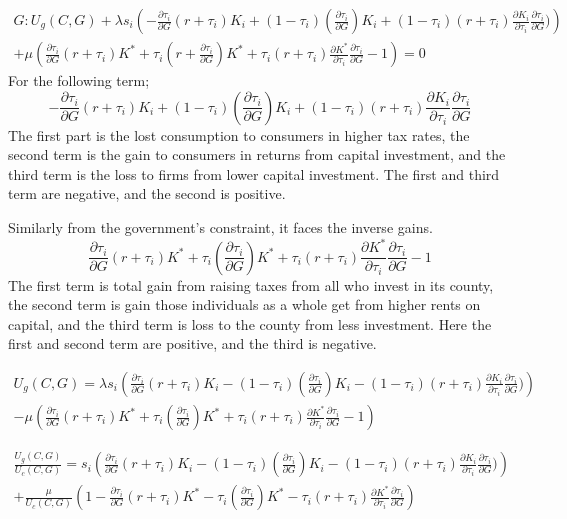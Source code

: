 \documentclass{article}
\begin{document}
\begin{multline}
G: U_{g}(C,G) +\lambda s_{i}\left(-\frac{\partial \tau_{i}}{\partial G}(r+\tau_{i})K_{i}+(1-\tau_{i})(\frac{\partial \tau_{i}}{\partial G})K_{i}+(1-\tau_{i})(r+\tau_{i})\frac{\partial K_{i}}{\partial \tau_{i}}\frac{\partial \tau_{i}}{\partial G})\right) \\
 + \mu\left(\frac{\partial \tau_{i}}{\partial G}(r+\tau_{i})K^{*}+\tau_{i}(r+\frac{\partial \tau_{i}}{\partial G})K^{*}+\tau_{i}(r+\tau_{i})\frac{\partial K^{*}}{\partial \tau_{i}}\frac{\partial \tau_{i}}{\partial G}-1\right) = 0
\end{multline}
For the following term;
$$-\frac{\partial \tau_{i}}{\partial G}(r+\tau_{i})K_{i}+(1-\tau_{i})(\frac{\partial \tau_{i}}{\partial G})K_{i}+(1-\tau_{i})(r+\tau_{i})\frac{\partial K_{i}}{\partial \tau_{i}}\frac{\partial \tau_{i}}{\partial G}$$
The first part is the lost consumption to consumers in higher tax rates, the second term is the gain to consumers in returns from capital investment, and the third term is the loss to firms from lower capital investment. The first and third term are negative, and the second is positive.

Similarly from the government's constraint, it faces the inverse gains.
$$\frac{\partial \tau_{i}}{\partial G}(r+\tau_{i})K^{*}+\tau_{i}(\frac{\partial \tau_{i}}{\partial G})K^{*}+\tau_{i}(r+\tau_{i})\frac{\partial K^{*}}{\partial \tau_{i}}\frac{\partial \tau_{i}}{\partial G}-1$$
The first term is total gain from raising taxes from all who invest in its county, the second term is gain those individuals as a whole get from higher rents on capital, and the third term is loss to the county from less investment. Here the first and second term are positive, and the third is negative.

\begin{multline}
U_{g}(C,G) =\lambda s_{i}\left(\frac{\partial \tau_{i}}{\partial G}(r+\tau_{i})K_{i}-(1-\tau_{i})(\frac{\partial \tau_{i}}{\partial G})K_{i}-(1-\tau_{i})(r+\tau_{i})\frac{\partial K_{i}}{\partial \tau_{i}}\frac{\partial \tau_{i}}{\partial G})\right) \\
 - \mu\left(\frac{\partial \tau_{i}}{\partial G}(r+\tau_{i})K^{*}+\tau_{i}(\frac{\partial \tau_{i}}{\partial G})K^{*}+\tau_{i}(r+\tau_{i})\frac{\partial K^{*}}{\partial \tau_{i}}\frac{\partial \tau_{i}}{\partial G}-1\right)
\end{multline}

\begin{multline}
\frac{U_{g}(C,G)}{U_{c}(C,G)} = s_{i}\left(\frac{\partial \tau_{i}}{\partial G}(r+\tau_{i})K_{i}-(1-\tau_{i})(\frac{\partial \tau_{i}}{\partial G})K_{i}-(1-\tau_{i})(r+\tau_{i})\frac{\partial K_{i}}{\partial \tau_{i}}\frac{\partial \tau_{i}}{\partial G})\right) \\
 + \frac{\mu}{U_{c}(C,G)}\left(1-\frac{\partial \tau_{i}}{\partial G}(r+\tau_{i})K^{*}-\tau_{i}(\frac{\partial \tau_{i}}{\partial G})K^{*}-\tau_{i}(r+\tau_{i})\frac{\partial K^{*}}{\partial \tau_{i}}\frac{\partial \tau_{i}}{\partial G}\right)
\end{multline}
\end{document}
